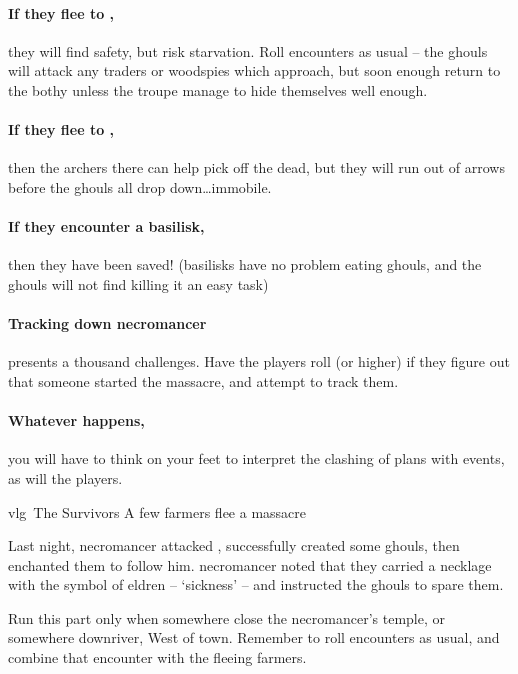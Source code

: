 \paragraph{If they flee to ,}
they will find safety, but risk starvation.
Roll encounters as usual -- the ghouls will attack any traders or woodspies which approach, but soon enough return to the \gls{bothy} unless the troupe manage to hide themselves well enough.

\paragraph{If they flee to ,}
then the archers there can help pick off the dead, but they will run out of arrows before the ghouls all drop down\ldots immobile.

\paragraph{If they encounter a basilisk,}
then they have been saved!
(basilisks have no problem eating ghouls, and the ghouls will not find killing it an easy task)

\paragraph{Tracking down \gls{necromancer}}
presents a thousand challenges.
Have the players roll  (\tn[14] or higher) if they figure out that someone started the massacre, and attempt to track them.

\paragraph{Whatever happens,}
you will have to think on your feet to interpret the clashing of plans with events, as will the players.

{\gls{vlg}~The Survivors}%
{A few farmers flee a massacre}%

\begin{exampletext}
  Last night, \gls{necromancer} attacked , successfully created some ghouls, then enchanted them to follow him.
  \Gls{necromancer} noted that they carried a necklage with the symbol of \gls{eldren} -- `\gls{sickness}' -- and instructed the ghouls to spare them.
\end{exampletext}

Run this part only when somewhere close the \gls{necromancer}'s temple, or somewhere downriver, West of \gls{town}.
Remember to roll encounters as usual, and combine that encounter with the fleeing farmers.

